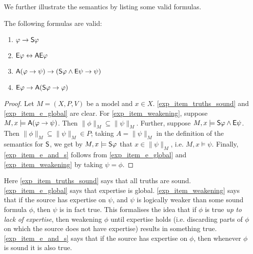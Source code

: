 We further illustrate the semantics by listing some valid formulas.

\begin{proposition}
\label{exp_prop_validities}

    The following formulas are valid:

    \begin{enumerate}
        \item\label{exp_item_truths_sound} $\phi \limplies \S\phi$

        \item\label{exp_item_e_global} $\E\phi \liff \A\E\phi$

        \item\label{exp_item_weakening} $\A(\phi \limplies \psi) \limplies (\S\phi
        \land \E\psi \limplies \psi)$

        \item\label{exp_item_e_and_s} $\E\phi \limplies \A(\S\phi \limplies \phi)$

    \end{enumerate}
\end{proposition}

\begin{proof}

    Let $M = (X, P, V)$ be a model and $x \in X$. \cref{exp_item_truths_sound} and
    \cref{exp_item_e_global} are clear. For \cref{exp_item_weakening}, suppose $M, x
    \models \A(\phi \limplies \psi)$. Then $\|\phi\|_M \subseteq \|\psi\|_M$.
    Further, suppose $M, x \models \S\phi \land \E\psi$. Then $\|\phi\|_M
    \subseteq \|\psi\|_M \in P$; taking $A = \|\psi\|_M$ in the definition of
    the semantics for $\S$, we get by $M, x \models \S\phi$ that $x \in
    \|\psi\|_M$, i.e. $M, x \models \psi$. Finally, \cref{exp_item_e_and_s}
    follows from \cref{exp_item_e_global} and \cref{exp_item_weakening} by taking
    $\psi = \phi$.
\end{proof}

Here \cref{exp_item_truths_sound} says that all truths are sound.
\cref{exp_item_e_global} says that expertise is global. \cref{exp_item_weakening} says
that if the source has expertise on $\psi$, and $\psi$ is logically weaker than
some sound formula $\phi$, then $\psi$ is in fact true. This formalises the
idea that if $\phi$ is true \emph{up to lack of expertise}, then weakening
$\phi$ until expertise holds (i.e. discarding parts of $\phi$ on which the
source does not have expertise) results in something true. \cref{exp_item_e_and_s}
says that if the source has expertise on $\phi$, then whenever $\phi$ is sound
it is also true.


